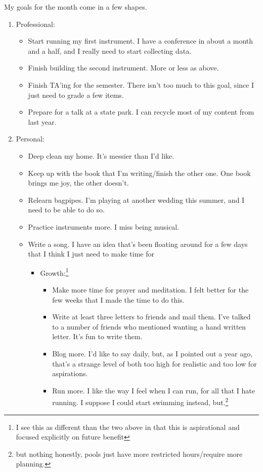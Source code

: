 \documentclass[12pt]{article}[titlepage]
\renewcommand{\,}{\textsuperscript{,}}
\begin{document}
My goals for the month come in a few shapes.
\begin{enumerate}
\item Professional:
\begin{itemize}
\item Start running my first instrument. I have a conference in about a month and a half, and I really need to start collecting data.
\item Finish building the second instrument. More or less as above.
\item Finish TA'ing for the semester. There isn't too much to this goal, since I just need to grade a few items.
\item Prepare for a talk at a state park. I can recycle most of my content from last year.
\end{itemize}
\item Personal:
\begin{itemize}
\item Deep clean my home. It's messier than I'd like.
\item Keep up with the book that I'm writing/finish the other one. One book brings me joy, the other doesn't.
\item Relearn bagpipes. I'm playing at another wedding this summer, and I need to be able to do so.
\item Practice instruments more. I miss being musical.
\item Write a song. I have an idea that's been floating around for a few days that I think I just need to make time for
\begin{itemize}
\item Growth:\footnote{I see this as different than the two above in that this is aspirational and focused explicitly on future benefit}
\begin{itemize}
\item Make more time for prayer and meditation. I felt better for the few weeks that I made the time to do this.
\item Write at least three letters to friends and mail them. I've talked to a number of friends who mentioned wanting a hand written letter. It's fun to write them.
\item Blog more. I'd like to say daily, but, as I pointed out a year ago, that's a strange level of both too high for realistic and too low for aspirations.
\item Run more. I like the way I feel when I can run, for all that I hate running. I suppose I could start swimming instead, but.\footnote{but nothing honestly, pools just have more restricted hours/require more planning.}

\end{itemize}
\end{itemize}
\end{itemize}
\end{enumerate}
\end{document}
